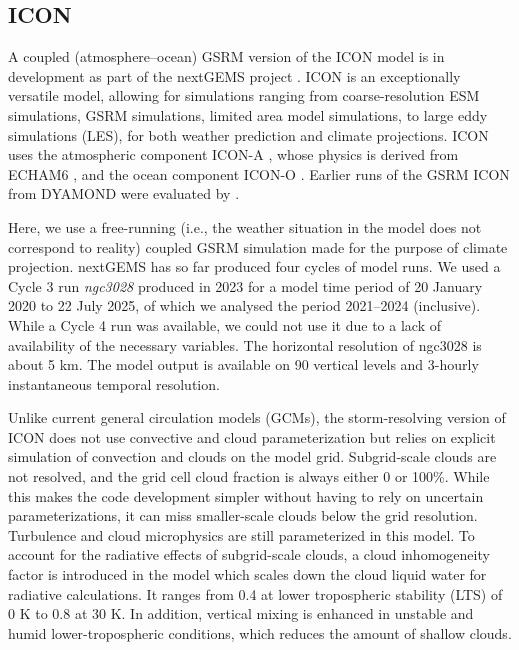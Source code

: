 \documentclass[12pt,a4paper]{article}
\begin{document}
\subsection{ICON}
\label{sec:icon}

A coupled (atmosphere--ocean) GSRM version of the ICON model is in development
as part of the nextGEMS project \citep{hohenegger2023}. ICON is an exceptionally
versatile model, allowing for simulations ranging from coarse-resolution ESM
simulations, GSRM simulations, limited area model simulations, to large eddy
simulations (LES), for both weather prediction and climate projections. ICON
uses the atmospheric component ICON-A \citep{giorgetta2018}, whose physics is
derived from ECHAM6 \citep{stevens2013}, and the ocean component ICON-O
\citep{korn2022}. Earlier runs of the GSRM ICON from DYAMOND were evaluated by
\cite{mauritsen2022}.

Here, we use a free-running (i.e., the weather situation in the model does not
correspond to reality) coupled GSRM simulation made for the purpose of climate
projection.  nextGEMS has so far produced four cycles of model runs. We used a
Cycle 3 run \emph{ngc3028} produced in 2023 \citep{nextgems2023a,nextgems2023b}
for a model time period of 20 January 2020 to 22 July 2025, of which we
analysed the period 2021--2024 (inclusive). While a Cycle 4 run was available,
we could not use it due to a lack of availability of the necessary variables.
The horizontal resolution of ngc3028 is about 5 km.  The model output is
available on 90 vertical levels and 3-hourly instantaneous temporal resolution.

Unlike current general circulation models (GCMs), the storm-resolving version
of ICON does not use convective and cloud parameterization but relies on
explicit simulation of convection and clouds on the model grid. Subgrid-scale
clouds are not resolved, and the grid cell cloud fraction is always either 0 or
100\%. While this makes the code development simpler without having to rely on
uncertain parameterizations, it can miss smaller-scale clouds below the grid
resolution.  Turbulence and cloud microphysics are still parameterized in this
model. To account for the radiative effects of subgrid-scale clouds, a cloud
inhomogeneity factor is introduced in the model which scales down the cloud
liquid water for radiative calculations. It ranges from 0.4 at lower
tropospheric stability (LTS) of 0 K to 0.8 at 30 K. In addition, vertical
mixing is enhanced in unstable and humid lower-tropospheric conditions, which
reduces the amount of shallow clouds.
\end{document}
